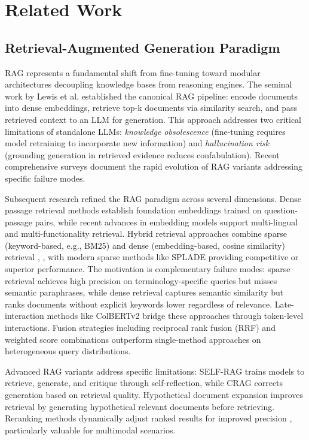 \documentclass[11pt,a4paper,twocolumn]{article}
\begin{document}
\section{Related Work}

\subsection{Retrieval-Augmented Generation Paradigm}

RAG represents a fundamental shift from fine-tuning toward modular architectures decoupling knowledge bases from reasoning engines. The seminal work by Lewis et al. \cite{lewis2020rag} established the canonical RAG pipeline: encode documents into dense embeddings, retrieve top-k documents via similarity search, and pass retrieved context to an LLM for generation. This approach addresses two critical limitations of standalone LLMs: \textit{knowledge obsolescence} (fine-tuning requires model retraining to incorporate new information) and \textit{hallucination risk} (grounding generation in retrieved evidence reduces confabulation). Recent comprehensive surveys \cite{gao2023rag_survey} document the rapid evolution of RAG variants addressing specific failure modes.

Subsequent research refined the RAG paradigm across several dimensions. Dense passage retrieval methods \cite{karpukhin2020dense} establish foundation embeddings trained on question-passage pairs, while recent advances in embedding models \cite{chen2024bge} support multi-lingual and multi-functionality retrieval. Hybrid retrieval approaches combine sparse (keyword-based, e.g., BM25) and dense (embedding-based, cosine similarity) retrieval \cite{luan2021sparse_dense}, \cite{lin2021densifying}, with modern sparse methods like SPLADE \cite{splade2021} providing competitive or superior performance. The motivation is complementary failure modes: sparse retrieval achieves high precision on terminology-specific queries but misses semantic paraphrases, while dense retrieval captures semantic similarity but ranks documents without explicit keywords lower regardless of relevance. Late-interaction methods like ColBERTv2 \cite{colbertv2} bridge these approaches through token-level interactions. Fusion strategies including reciprocal rank fusion (RRF) and weighted score combinations outperform single-method approaches on heterogeneous query distributions.

Advanced RAG variants address specific limitations: SELF-RAG \cite{asai2023selfrag} trains models to retrieve, generate, and critique through self-reflection, while CRAG \cite{crag2024} corrects generation based on retrieval quality. Hypothetical document expansion \cite{hyde2022} improves retrieval by generating hypothetical relevant documents before retrieving. Reranking methods dynamically adjust ranked results for improved precision \cite{covrag2024}, particularly valuable for multimodal scenarios.
\end{document}
